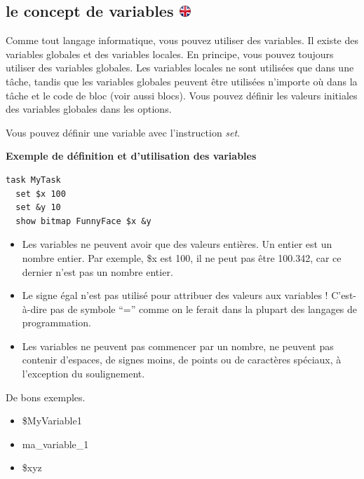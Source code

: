\documentclass[
]{book}
\providecommand{\tightlist}{%
  \setlength{\itemsep}{0pt}\setlength{\parskip}{0pt}}
\begin{document}
\hypertarget{le-concept-de-variables}{%
\subsection[le concept de variables ]{\texorpdfstring{le concept de variables \href{https://www.psytoolkit.org/doc3.2.0/syntax.html\#variables-explained}{\protect\includegraphics{img/ukflag.png}}}{le concept de variables }}\label{le-concept-de-variables}}

Comme tout langage informatique, vous pouvez utiliser des variables. Il existe des variables globales et des variables locales. En principe, vous pouvez toujours utiliser des variables globales. Les variables locales ne sont utilisées que dans une tâche, tandis que les variables globales peuvent être utilisées n'importe où dans la tâche et le code de bloc (voir aussi blocs). Vous pouvez définir les valeurs initiales des variables globales dans les options.

Vous pouvez définir une variable avec l'instruction \emph{set}.

\textbf{Exemple de définition et d'utilisation des variables}

\begin{verbatim}
task MyTask
  set $x 100
  set &y 10
  show bitmap FunnyFace $x &y
\end{verbatim}

\begin{itemize}
\tightlist
\item
  Les variables ne peuvent avoir que des valeurs entières. Un entier est un nombre entier. Par exemple, \$x est 100, il ne peut pas être 100.342, car ce dernier n'est pas un nombre entier.
\item
  Le signe égal n'est pas utilisé pour attribuer des valeurs aux variables ! C'est-à-dire pas de symbole ``='' comme on le ferait dans la plupart des langages de programmation.
\item
  Les variables ne peuvent pas commencer par un nombre, ne peuvent pas contenir d'espaces, de signes moins, de points ou de caractères spéciaux, à l'exception du soulignement.
\end{itemize}

De bons exemples.

\begin{itemize}
\tightlist
\item
  \$MyVariable1
\item
  ma\_variable\_1
\item
  \$xyz
\end{itemize}
\end{document}
